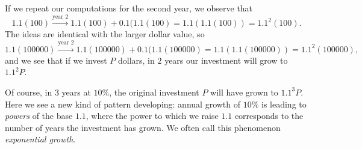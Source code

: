 \documentclass[nooutcomes]{ximera}
\begin{document}
If we repeat our computations for the second year, we observe that%
\begin{equation*}
1.1(100) \xrightarrow{\text{year } 2} 1.1(100) + 0.1(1.1(100) = 1.1(1.1(100)) = 1.1^2 (100)\text{.}
\end{equation*}
The ideas are identical with the larger dollar value, so%
\begin{equation*}
1.1(100000) \xrightarrow{\text{year } 2} 1.1(100000) + 0.1(1.1(100000) = 1.1(1.1(100000)) = 1.1^2 (100000)\text{,}
\end{equation*}
and we see that if we invest \(P\) dollars, in \(2\) years our investment will grow to \(1.1^2 P\).%

Of course, in \(3\) years at \(10\)\%, the original investment \(P\) will have grown to \(1.1^3 P\).  Here we see a new kind of pattern developing:  annual growth of \(10\)\% is leading to \emph{powers} of the base \(1.1\), where the power to which we raise \(1.1\) corresponds to the number of years the investment has grown.  We often call this phenomenon \emph{exponential growth}. 
\end{document}
